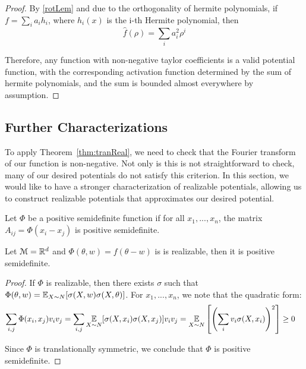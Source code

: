 \begin{proof}
By \ref{rotLem} and due to the orthogonality of hermite polynomials, if $f = \sum_i a_i h_i$, where $h_i(x)$ is the i-th Hermite polynomial, then
%
\[\widehat{f}(\rho) = \sum_{i} a_i^2 \rho^i\]

Therefore, any function with non-negative taylor coefficients is a valid potential function, with the corresponding activation function determined by the sum of hermite polynomials, and the sum is bounded almost everywhere by assumption.
\end{proof}

\subsection{Further Characterizations}

To apply Theorem~\ref{thm:tranReal}, we need to check that the Fourier transform of our function is non-negative. Not only is this is not straightforward to check, many of our desired potentials do not satisfy this criterion. In this section, we would like to have a stronger characterization of realizable potentials, allowing us to construct realizable potentials that approximates our desired potential.
 
\begin{definition}
Let $\Phi$ be a positive semidefinite function if for all $x_1,...,x_n$, the matrix $A_{ij} = \Phi(x_i - x_j)$ is positive semidefinite. 
\end{definition}

\begin{lemma}\label{lem:psd}
Let $\mathcal{M} = {\mathbb{R}}^d$ and $\Phi(\theta, w) = f(\theta-w)$ is is realizable, then it is positive semidefinite.
\end{lemma}

\begin{proof}
If $\Phi$ is realizable, then there exists $\sigma$ such that  $\Phi(\theta, w) =  \operatorname*{\mathbb{E}}_{X \sim N}[\sigma(X, w)\sigma(X, \theta)]$. For $x_1,...,x_n$, we note that the quadratic form:
\begin{align*}
\sum_{i,j} \Phi(x_i,x_j) v_i v_j 
& = \sum_{i,j} \operatorname*{\mathbb{E}}_{X \sim N}[\sigma(X, x_i)\sigma(X, x_j)] v_i v_j 
 = \operatorname*{\mathbb{E}}_{X \sim N}\left[\left(\sum_{i}v_i \sigma(X , x_i) \right)^2\right] \geq 0
\end{align*}

Since $\Phi$ is translationally symmetric, we conclude that $\Phi$ is positive semidefinite.
\end{proof}



